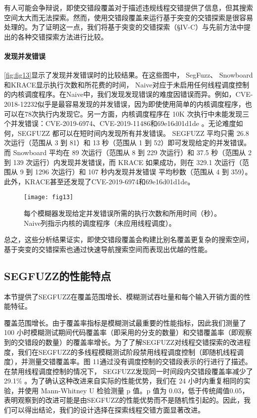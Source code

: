 有人可能会争辩说，即使交错段覆盖对于描述违规线程交错提供了信息，但其搜索空间太大而无法探索。然而，使用交错段覆盖来运行基于突变的交错探索是很容易处理的。为了证明这一点，我们将基于突变的交错探索（§IV-C）与先前方法中提出的各种交错探索方法进行比较。

\paragraph{发现并发错误}\autoref{fig:fig13}显示了发现并发错误时的比较结果。在这些图中， SegFuzz、 Snowboard和KRACE显示执行次数和所花费的时间， Naive对应于未启用任何线程调度控制的内核调度程序。在Naive中，我们发现发现错误的难度因错误而异。例如，CVE-2018-12232似乎是最容易发现的并发错误，因为即使使用简单的内核调度程序，也可以在78次执行内发现它。另一方面，内核调度程序在 10K 次执行中未能发现三个并发错误：CVE-2019-6974、CVE-2019-11486和69e16d01d1de 。无论难度如何，SEGFUZZ 都可以在短时间内发现所有并发错误。 SEGFUZZ 平均只需 26.8 次运行（范围从 3 到 81）和 13 秒（范围从 1 到 52）即可发现给定的并发错误。 而 Snowboard 平均在 89 次运行（范围从 8 到 229 次运行）和 37.5 秒（范围从 2 到 139 次运行）内发现并发错误，而 KRACE 如果成功，则在 329.1 次运行（范围从 9 到 1296 次运行）和 107 秒内发现并发错误 平均秒数（范围从 4 到 359）。 此外，KRACE甚至还发现了CVE-2019-6974和69e16d01d1de。

\begin{figure}[ht]
    \centering
    \texttt{[image: fig13]}
    \caption{\label{fig:fig13}每个模糊器发现给定并发错误所需的执行次数和所用时间（秒）。 Naive列指示内核的调度程序（未应用线程调度）。}
\end{figure}

总之，这些分析结果证实，即使交错段覆盖会构建比别名覆盖更复杂的搜索空间，基于突变的交错探索也通过快速导航搜索空间而表现出优越的性能。

\subsection{SEGFUZZ的性能特点}

本节提供了SEGFUZZ在覆盖范围增长、模糊测试吞吐量和每个输入开销方面的性能特征。

覆盖范围增长。由于覆盖率指标是模糊测试最重要的性能指标，因此我们测量了 100 小时模糊测试期间代码覆盖率（即采用的分支的数量）和交错覆盖率（即观察到的交错段的数量）的覆盖率增长。为了了解SEGFUZZ对线程交错探索的改进程度，我们在SEGFUZZ的多线程模糊测试阶段禁用线程调度控制（即随机线程调度），并测量交错覆盖率。图 11通过没有调度控制的交错段表示的行进行了描述。在禁用线程调度控制的情况下， SEGFUZZ发现同一时间段内交错段覆盖率减少了29.1\% 。为了确认这种改进来自实际的性能优势，我们在 24 小时内重复相同的实验，并使用 Mann-Whitney U 检验测量 p 值。p 值为 0.03，低于传统阈值0.05，表明观察到的改进可能是由SEGFUZZ的性能优势而不是随机性引起的。因此，我们可以得出结论，我们的设计选择在探索线程交错方面显著改进。


\begingroup
    \printbibliography[title={外文翻译参考文献}]
\endgroup
